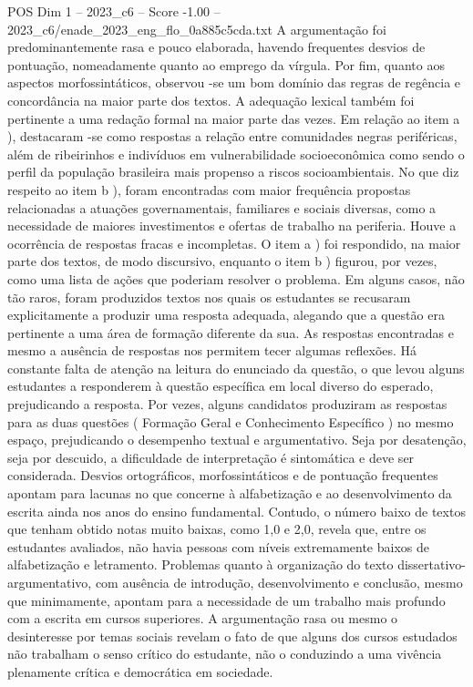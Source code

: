 \begin{textsample}{POS Dim 1 – 2023\_c6 – Score -1.00 – 2023\_c6/enade\_2023\_eng\_flo\_0a885c5cda.txt}
A argumentação foi predominantemente rasa e pouco elaborada, havendo frequentes desvios de pontuação, nomeadamente quanto ao emprego da vírgula.
Por fim, quanto aos aspectos morfossintáticos, observou -se um bom domínio das regras de regência e concordância na maior parte dos textos.
A adequação lexical também foi pertinente a uma redação formal na maior parte das vezes.
Em relação ao item a ), destacaram -se como respostas a relação entre comunidades negras periféricas, além de ribeirinhos e indivíduos em vulnerabilidade socioeconômica como sendo o perfil da população brasileira mais propenso a riscos socioambientais.
No que diz respeito ao item b ), foram encontradas com maior frequência propostas relacionadas a atuações governamentais, familiares e sociais diversas, como a necessidade de maiores investimentos e ofertas de trabalho na periferia.
Houve a ocorrência de respostas fracas e incompletas.
O item a ) foi respondido, na maior parte dos textos, de modo discursivo, enquanto o item b ) figurou, por vezes, como uma lista de ações que poderiam resolver o problema.
Em alguns casos, não tão raros, foram produzidos textos nos quais os estudantes se recusaram explicitamente a produzir uma resposta adequada, alegando que a questão era pertinente a uma área de formação diferente da sua.
As respostas encontradas e mesmo a ausência de respostas nos permitem tecer algumas reflexões.
Há constante falta de atenção na leitura do enunciado da questão, o que levou alguns estudantes a responderem à questão específica em local diverso do esperado, prejudicando a resposta.
Por vezes, alguns candidatos produziram as respostas para as duas questões ( Formação Geral e Conhecimento Específico ) no mesmo espaço, prejudicando o desempenho textual e argumentativo.
Seja por desatenção, seja por descuido, a dificuldade de interpretação é sintomática e deve ser considerada.
Desvios ortográficos, morfossintáticos e de pontuação frequentes apontam para lacunas no que concerne à alfabetização e ao desenvolvimento da escrita ainda nos anos do ensino fundamental.
Contudo, o número baixo de textos que tenham obtido notas muito baixas, como 1,0 e 2,0, revela que, entre os estudantes avaliados, não havia pessoas com níveis extremamente baixos de alfabetização e letramento.
Problemas quanto à organização do texto dissertativo-argumentativo, com ausência de introdução, desenvolvimento e conclusão, mesmo que minimamente, apontam para a necessidade de um trabalho mais profundo com a escrita em cursos superiores.
A argumentação rasa ou mesmo o desinteresse por temas sociais revelam o fato de que alguns dos cursos estudados não trabalham o senso crítico do estudante, não o conduzindo a uma vivência plenamente crítica e democrática em sociedade.

\end{textsample}
